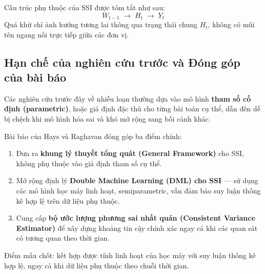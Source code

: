 Cấu trúc phụ thuộc của SSI được tóm tắt như sau:
\[
    W_{t-1} \;\longrightarrow\; H_t \;\longrightarrow\; Y_t
\]
Quá khứ chỉ ảnh hưởng tương lai thông qua trạng thái chung \(H_t\), không có mũi tên ngang nối trực tiếp giữa các đơn vị.

\subsection{Hạn chế của nghiên cứu trước và Đóng góp của bài báo}

Các nghiên cứu trước đây về nhiễu loạn thường dựa vào mô hình \textbf{tham số cố định (parametric)}, hoặc giả định đặc thù cho từng bài toán cụ thể, dẫn đến dễ bị chệch khi mô hình hóa sai và khó mở rộng sang bối cảnh khác.

Bài báo của Hays và Raghavan \cite{hays2025double} đóng góp ba điểm chính:

\begin{enumerate}
    \item Đưa ra \textbf{khung lý thuyết tổng quát (General Framework)} cho SSI, không phụ thuộc vào giả định tham số cụ thể.
    \item Mở rộng định lý \textbf{Double Machine Learning (DML) cho SSI} --- sử dụng các mô hình học máy linh hoạt, semiparametric, vẫn đảm bảo suy luận thống kê hợp lệ trên dữ liệu phụ thuộc.
    \item Cung cấp \textbf{bộ ước lượng phương sai nhất quán (Consistent Variance Estimator)} để xây dựng khoảng tin cậy chính xác ngay cả khi các quan sát có tương quan theo thời gian.
\end{enumerate}

Điểm mấu chốt: kết hợp được tính linh hoạt của học máy với suy luận thống kê hợp lệ, ngay cả khi dữ liệu phụ thuộc theo chuỗi thời gian.
